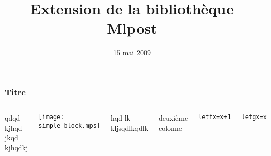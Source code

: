 \documentclass{beamer}
\title{Extension de la bibliothèque Mlpost}
\author{}
\date{15 mai 2009}
\begin{document}
\begin{frame}
  \maketitle
\end{frame}

\begin{frame}
  \frametitle{Titre}

  \begin{columns}
    qdqd kjhqd jkqd kjhqdkj

    \begin{center}
      \texttt{[image: simple\_block.mps]}
    \end{center}
    hqd lk kljsqdlkqdlk

    deuxième colonne

    \begin{alltt}
      let f x = x+1

      let g x = x
    \end{alltt}
  \end{columns}
\end{frame}
\end{document}
